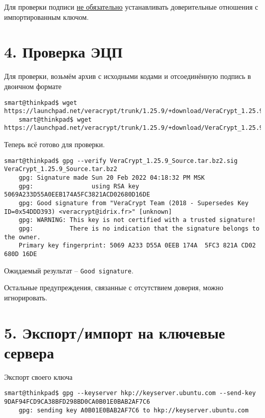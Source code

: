 Для проверки подписи \underline{не обязательно} устанавливать доверительные отношения с импортированным ключом.

\section*{4. Проверка ЭЦП}

Для проверки, возьмём архив с исходными кодами и отсоединённую подпись в двоичном формате
\begin{Verbatim}[frame=single,breaklines=true,breakanywhere=true]
    smart@thinkpad$ wget https://launchpad.net/veracrypt/trunk/1.25.9/+download/VeraCrypt_1.25.9_Source.tar.bz2
    smart@thinkpad$ wget https://launchpad.net/veracrypt/trunk/1.25.9/+download/VeraCrypt_1.25.9_Source.tar.bz2.sig
\end{Verbatim}

Теперь всё готово для проверки.
\begin{Verbatim}[frame=single,breaklines=true,breakanywhere=true]
    smart@thinkpad$ gpg --verify VeraCrypt_1.25.9_Source.tar.bz2.sig VeraCrypt_1.25.9_Source.tar.bz2
    gpg: Signature made Sun 20 Feb 2022 04:18:32 PM MSK
    gpg:                using RSA key 5069A233D55A0EEB174A5FC3821ACD02680D16DE
    gpg: Good signature from "VeraCrypt Team (2018 - Supersedes Key ID=0x54DDD393) <veracrypt@idrix.fr>" [unknown]
    gpg: WARNING: This key is not certified with a trusted signature!
    gpg:          There is no indication that the signature belongs to the owner.
    Primary key fingerprint: 5069 A233 D55A 0EEB 174A  5FC3 821A CD02 680D 16DE
\end{Verbatim}

Ожидаемый результат -- \texttt{Good signature}.

Остальные предупреждения, связанные с отсутствием доверия, можно игнорировать.

\section*{5. Экспорт/импорт на ключевые сервера}

Экспорт своего ключа
\begin{Verbatim}[frame=single,breaklines=true,breakanywhere=true]
    smart@thinkpad$ gpg --keyserver hkp://keyserver.ubuntu.com --send-key 9DAF94FCD9CA38BFD298BD0CA0B01E0BAB2AF7C6
    gpg: sending key A0B01E0BAB2AF7C6 to hkp://keyserver.ubuntu.com
\end{Verbatim}

